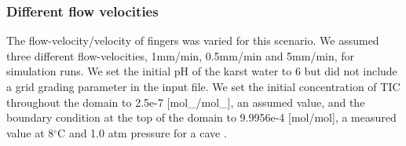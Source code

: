 \subsubsection*{Different flow velocities}\label{ssec:diffFlowVel}
The flow-velocity/velocity of  fingers was varied for this scenario. We assumed three different flow-velocities, 1mm/min, 0.5mm/min and 5mm/min, 
for simulation runs. We set the initial pH of the karst water to 6 but did not include a grid grading parameter in the input file. 
We set the initial concentration of TIC throughout the domain to 2.5e-7 [mol\_/mol\_], an assumed value, and the 
boundary condition at the top of the domain to 9.9956e-4 [mol/mol], a measured value at 8$^{\circ}$C and 1.0 atm pressure for a cave \cite{Class2020}. \\

